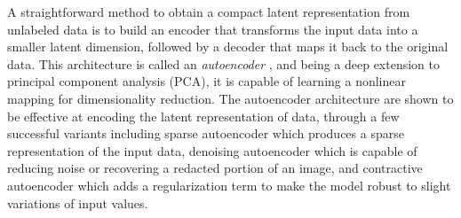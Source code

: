 A straightforward method to obtain a compact latent representation from unlabeled data is to build an encoder that transforms the input data into a smaller latent dimension, followed by a decoder that maps it back to the original data.
This architecture is called an \emph{autoencoder} \cite{bengio2009deeplearning}, and being a deep extension to principal component analysis (PCA), it is capable of learning a nonlinear mapping for dimensionality reduction.
The autoencoder architecture are shown to be effective at encoding the latent representation of data, through a few successful variants including sparse autoencoder \cite{ng2011sparse} which produces a sparse representation of the input data, denoising autoencoder \cite{vincent2008denoising} which is capable of reducing noise or recovering a redacted portion of an image, and contractive autoencoder \cite{rifai2011contractive} which adds a regularization term to make the model robust to slight variations of input values.


